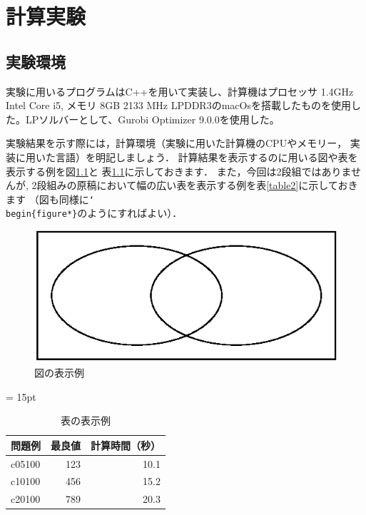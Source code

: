 \chapter{計算実験}\label{computational_result}
\section{実験環境}
実験に用いるプログラムはC++を用いて実装し、計算機はプロセッサ 1.4GHz Intel Core i5, メモリ 8GB 2133 MHz LPDDR3のmacOsを搭載したものを使用した。LPソルバーとして、Gurobi Optimizer 9.0.0を使用した。

実験結果を示す際には，計算環境（実験に用いた計算機のCPUやメモリー，
実装に用いた言語）を明記しましょう．
計算結果を表示するのに用いる図や表を表示する例を図\ref{fig1}と
表\ref{table1}に示しておきます．
また，今回は2段組ではありませんが, 2段組みの原稿において幅の広い表を表示する例を表\ref{table2}に示しておきます
（図も同様に\texttt{\char`\\begin\{figure*\}}のようにすればよい）．

\begin{figure}[htbp]
 \centering
 \includegraphics[width=0.9\linewidth]{sample_fig.eps}
 \caption{図の表示例}
 \label{fig1}
\end{figure}

\begin{table}[htbp]
 \centering
 \tabcolsep = 15pt
 \renewcommand{\arraystretch}{0.8}
 \caption{表の表示例}
 \label{table1}
 \begin{tabular}{lrr} \hline
  問題例 & 最良値 & 計算時間（秒） \\ \hline
  c05100 &    123 & 10.1 \\
  c10100 &    456 & 15.2 \\
  c20100 &    789 & 20.3 \\ \hline
 \end{tabular}
\end{table}


